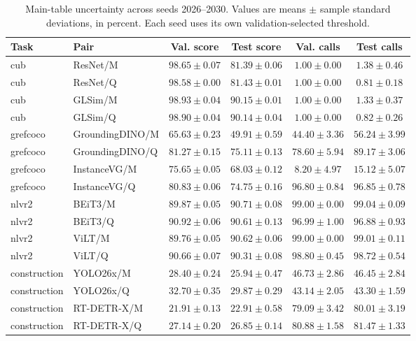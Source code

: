 \begin{table}[H]\centering
\caption{Main-table uncertainty across seeds 2026--2030. Values are means $\pm$ sample standard deviations, in percent. Each seed uses its own validation-selected threshold.}
\fontsize{8}{10}\selectfont
\setlength{\tabcolsep}{4pt}
\begin{tabular}{llcccc}\toprule Task & Pair & Val. score & Test score & Val. calls & Test calls \\\midrule
cub & ResNet/M & $98.65\pm0.07$ & $81.39\pm0.06$ & $1.00\pm0.00$ & $1.38\pm0.46$ \\
cub & ResNet/Q & $98.58\pm0.00$ & $81.43\pm0.01$ & $1.00\pm0.00$ & $0.81\pm0.18$ \\
cub & GLSim/M & $98.93\pm0.04$ & $90.15\pm0.01$ & $1.00\pm0.00$ & $1.33\pm0.37$ \\
cub & GLSim/Q & $98.90\pm0.04$ & $90.14\pm0.04$ & $1.00\pm0.00$ & $0.82\pm0.26$ \\
grefcoco & GroundingDINO/M & $65.63\pm0.23$ & $49.91\pm0.59$ & $44.40\pm3.36$ & $56.24\pm3.99$ \\
grefcoco & GroundingDINO/Q & $81.27\pm0.15$ & $75.11\pm0.13$ & $78.60\pm5.94$ & $89.17\pm3.06$ \\
grefcoco & InstanceVG/M & $75.65\pm0.05$ & $68.03\pm0.12$ & $8.20\pm4.97$ & $15.12\pm5.07$ \\
grefcoco & InstanceVG/Q & $80.83\pm0.06$ & $74.75\pm0.16$ & $96.80\pm0.84$ & $96.85\pm0.78$ \\
nlvr2 & BEiT3/M & $89.87\pm0.05$ & $90.71\pm0.08$ & $99.00\pm0.00$ & $99.04\pm0.09$ \\
nlvr2 & BEiT3/Q & $90.92\pm0.06$ & $90.61\pm0.13$ & $96.99\pm1.00$ & $96.88\pm0.93$ \\
nlvr2 & ViLT/M & $89.76\pm0.05$ & $90.62\pm0.06$ & $99.00\pm0.00$ & $99.01\pm0.11$ \\
nlvr2 & ViLT/Q & $90.66\pm0.07$ & $90.31\pm0.08$ & $98.80\pm0.45$ & $98.72\pm0.54$ \\
construction & YOLO26x/M & $28.40\pm0.24$ & $25.94\pm0.47$ & $46.73\pm2.86$ & $46.45\pm2.84$ \\
construction & YOLO26x/Q & $32.70\pm0.35$ & $29.87\pm0.29$ & $43.14\pm2.05$ & $43.30\pm1.59$ \\
construction & RT-DETR-X/M & $21.91\pm0.13$ & $22.91\pm0.58$ & $79.09\pm3.42$ & $80.01\pm3.19$ \\
construction & RT-DETR-X/Q & $27.14\pm0.20$ & $26.85\pm0.14$ & $80.88\pm1.58$ & $81.47\pm1.33$ \\
\bottomrule\end{tabular}\end{table}
